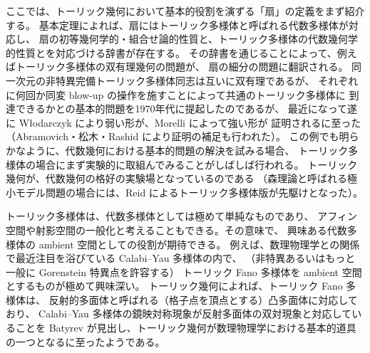 \documentclass[uplatex,dvipdfmx]{jlreq}
\begin{document}
ここでは、トーリック幾何において基本的役割を演ずる「扇」の定義をまず紹介する。
基本定理によれば、扇にはトーリック多様体と呼ばれる代数多様体が対応し、
扇の初等幾何学的・組合せ論的性質と、トーリック多様体の代数幾何学的性質とを対応づける辞書が存在する。
その辞書を通じることによって、例えばトーリック多様体の双有理幾何の問題が、
扇の細分の問題に翻訳される。
同一次元の非特異完備トーリック多様体同志は互いに双有理であるが、
それぞれに何回か同変 blow-up の操作を施すことによって共通のトーリック多様体に
到達できるかとの基本的問題を1970年代に提起したのであるが、
最近になって遂に W{\l}odarczyk により弱い形が、Morelli によって強い形が
証明されるに至った（Abramovich・松木・Rashid により証明の補足も行われた）。
この例でも明らかなように、代数幾何における基本的問題の解決を試みる場合、
トーリック多様体の場合にまず実験的に取組んでみることがしばしば行われる。
トーリック幾何が、代数幾何の格好の実験場となっているのである
（森理論と呼ばれる極小モデル問題の場合には、Reid によるトーリック多様体版が先駆けとなった）。

トーリック多様体は、代数多様体としては極めて単純なものであり、
アフィン空間や射影空間の一般化と考えることもできる。その意味で、
興味ある代数多様体の ambient 空間としての役割が期待できる。
例えば、数理物理学との関係で最近注目を浴びている Calabi--Yau 多様体の内で、
（非特異あるいはもっと一般に Gorenstein 特異点を許容する）
トーリック Fano 多様体を ambient 空間とするものが極めて興味深い。
トーリック幾何によれば、トーリック Fano 多様体は、
反射的多面体と呼ばれる（格子点を頂点とする）凸多面体に対応しており、
Calabi--Yau 多様体の鏡映対称現象が反射多面体の双対現象と対応していることを
Batyrev が見出し、トーリック幾何が数理物理学における基本的道具の一つとなるに至ったようである。

\bigskip


\renewcommand{\labelenumi}{[\arabic{enumi}]}
\end{document}
